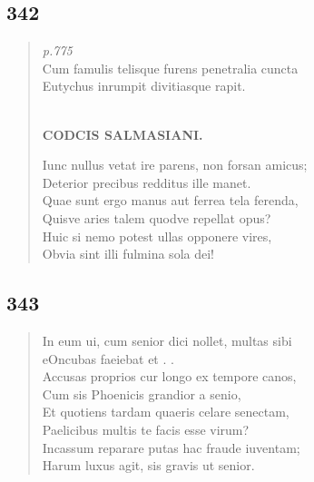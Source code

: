\documentclass[11pt, a4paper]{report}
\begin{document}
            \subsection*{342}
      \begin{verse}
      \textit{p.775} \\ Cum famulis telisque furens penetralia cuncta \\ Eutychus inrumpit divitiasque rapit. \\ 
        ﻿\pagebreak 
    \begin{center} \textbf{CODCIS SALMASIANI.} \end{center} \marginpar{[0]}  \marginpar{[40]} Iunc nullus vetat ire parens, non forsan amicus; \\ Deterior precibus redditus ille manet. \\ Quae sunt ergo manus aut ferrea tela ferenda, \\ Quisve aries talem quodve repellat opus? \\ Huic si nemo potest ullas opponere vires, \\ Obvia sint illi fulmina sola dei! \\ 
      \end{verse}
  
            \subsection*{343}
      \begin{verse}
      In eum ui, cum senior dici nollet, multas sibi \\ eOncubas faeiebat et . . \\ Accusas proprios cur longo ex tempore canos, \\ Cum sis Phoenicis grandior a senio, \\ Et quotiens tardam quaeris celare senectam, \\ Paelicibus multis te facis esse virum? \\ Incassum reparare putas hac fraude iuventam; \\ Harum luxus agit, sis gravis ut senior. \\ 
      \end{verse}
  
\end{document}
